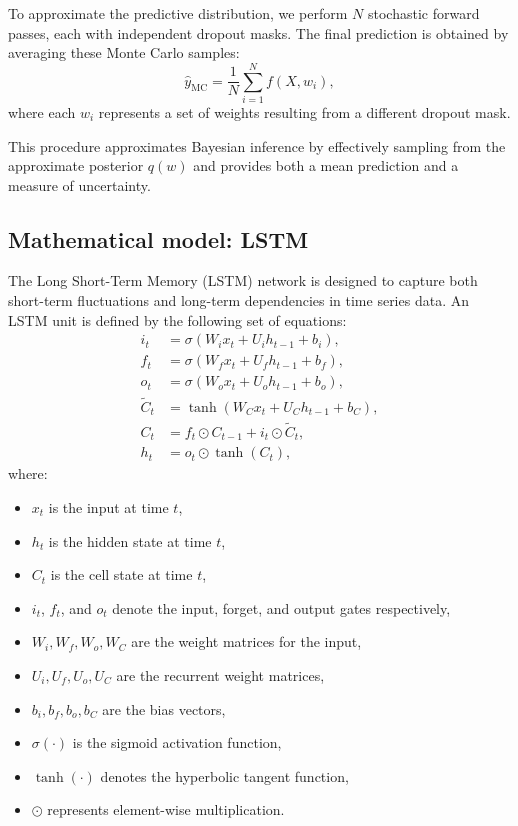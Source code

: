 \noindent To approximate the predictive distribution, we perform \(N\) stochastic forward passes, each with independent dropout masks. The final prediction is obtained by averaging these Monte Carlo samples:
\begin{equation}
    \hat{y}_{\text{MC}} = \frac{1}{N} \sum_{i=1}^{N} f(X, w_i),
    \label{eq:mc_dropout_prediction}
\end{equation}
where each \(w_i\) represents a set of weights resulting from a different dropout mask.

\noindent This procedure approximates Bayesian inference by effectively sampling from the approximate posterior \(q(w)\) and provides both a mean prediction and a measure of uncertainty.

\subsection{Mathematical model: LSTM}
\label{math:LSTM}
The Long Short-Term Memory (LSTM) network is designed to capture both short-term fluctuations and long-term dependencies in time series data. An LSTM unit is defined by the following set of equations:
\begin{align}
    i_t &= \sigma\left(W_i x_t + U_i h_{t-1} + b_i\right), \label{eq:lstm_input}\\[1mm]
    f_t &= \sigma\left(W_f x_t + U_f h_{t-1} + b_f\right), \label{eq:lstm_forget}\\[1mm]
    o_t &= \sigma\left(W_o x_t + U_o h_{t-1} + b_o\right), \label{eq:lstm_output}\\[1mm]
    \tilde{C}_t &= \tanh\left(W_C x_t + U_C h_{t-1} + b_C\right), \label{eq:lstm_candidate}\\[1mm]
    C_t &= f_t \odot C_{t-1} + i_t \odot \tilde{C}_t, \label{eq:lstm_cell}\\[1mm]
    h_t &= o_t \odot \tanh\left(C_t\right), \label{eq:lstm_hidden}
\end{align}
where:
\begin{itemize}
    \item \(x_t\) is the input at time \(t\),
    \item \(h_t\) is the hidden state at time \(t\),
    \item \(C_t\) is the cell state at time \(t\),
    \item \(i_t\), \(f_t\), and \(o_t\) denote the input, forget, and output gates respectively,
    \item \(W_i, W_f, W_o, W_C\) are the weight matrices for the input,
    \item \(U_i, U_f, U_o, U_C\) are the recurrent weight matrices,
    \item \(b_i, b_f, b_o, b_C\) are the bias vectors,
    \item \(\sigma(\cdot)\) is the sigmoid activation function,
    \item \(\tanh(\cdot)\) denotes the hyperbolic tangent function,
    \item \(\odot\) represents element-wise multiplication.
\end{itemize}

